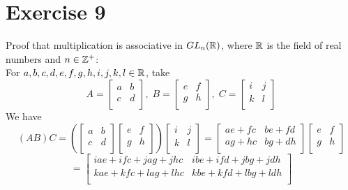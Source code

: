 \documentclass[12pt]{article}
\begin{document}
    \section*{Exercise 9}
    Proof that multiplication is associative in $GL_n(\mathbb{R})$,
    where $\mathbb{R}$ is the field of real numbers and $n \in \mathbb{Z}^+$: \\
    For $a, b, c, d, e, f, g, h, i, j, k, l \in \mathbb{R}$, take
    \[ A =
    \begin{bmatrix}
    a & b \\
    c & d \\
    \end{bmatrix}, \;
    B =
    \begin{bmatrix}
    e & f \\
    g & h \\
    \end{bmatrix}, \;
    C =
    \begin{bmatrix}
    i & j \\
    k & l \\
    \end{bmatrix} \]
    We have
    \[ (AB)C =
    \left( \begin{bmatrix}
    a & b \\
    c & d \\
    \end{bmatrix}
    \begin{bmatrix}
    e & f \\
    g & h \\
    \end{bmatrix} \right)
    \begin{bmatrix}
    i & j \\
    k & l \\
    \end{bmatrix} 
    = \begin{bmatrix}
    ae + fc & be + fd \\
    ag + hc & bg + dh \\
    \end{bmatrix}
    \begin{bmatrix}
    e & f \\
    g & h \\
    \end{bmatrix} \]
    \[ = \begin{bmatrix}
    iae + ifc + jag + jhc & ibe + ifd + jbg + jdh \\
    kae + kfc + lag + lhc & kbe + kfd + lbg + ldh \\
    \end{bmatrix} \]
\end{document}
